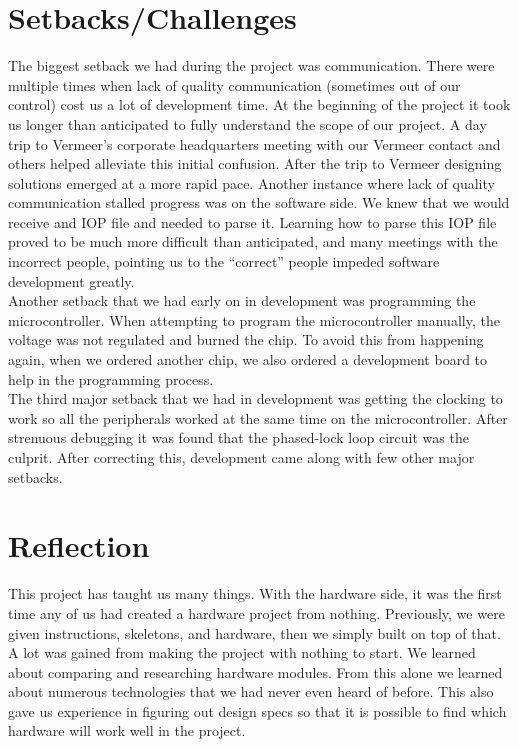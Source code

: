 \documentclass[paper=a4, fontsize=11pt]{scrartcl}
\numberwithin{equation}{section}		%
\numberwithin{figure}{section}			%
\numberwithin{table}{section}				%
\begin{document}
\section{Setbacks/Challenges} 
The biggest setback we had during the project was communication. There were multiple times when lack of quality communication (sometimes out of our control) cost us a lot of development time. At the beginning of the project it took us longer than anticipated to fully understand the scope of our project. A day trip to Vermeer’s corporate headquarters meeting with our Vermeer contact and others helped alleviate this initial confusion. After the trip to Vermeer designing solutions emerged at a more rapid pace. Another instance where lack of quality communication stalled progress was on the software side. We knew that we would receive and IOP file and needed to parse it. Learning how to parse this IOP file proved to be much more difficult than anticipated, and many meetings with the incorrect people, pointing us to the “correct” people impeded software development greatly. \\

Another setback that we had early on in development was programming the microcontroller. When attempting to program the microcontroller manually, the voltage was not regulated and burned the chip. To avoid this from happening again, when we ordered another chip, we also ordered a development board to help in the programming process. \\

The third major setback that we had in development was getting the clocking to work so all the peripherals worked at the same time on the microcontroller. After strenuous debugging it was found that the phased-lock loop circuit was the culprit. After correcting this, development came along with few other major setbacks. \\

\section{Reflection}
This project has taught us many things. With the hardware side, it was the first time any of us had created a hardware project from nothing. Previously, we were given instructions, skeletons, and hardware, then we simply built on top of that. A lot was gained from making the project with nothing to start. We learned about comparing and researching hardware modules. From this alone we learned about numerous technologies that we had never even heard of before. This also gave us experience in figuring out design specs so that it is possible to find which hardware will work well in the project.\\
\end{document}
